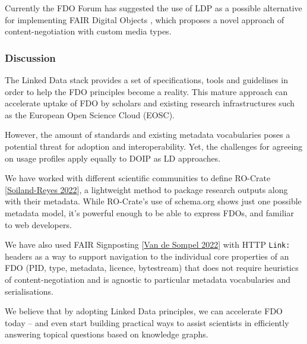 Currently the FDO Forum has suggested the use of LDP as a possible
alternative for implementing FAIR Digital Objects \cite{bonino2021}, which
proposes a novel approach of content-negotiation with custom media
types.

\subsubsection{Discussion}\label{ch2:discussion}

The Linked Data stack provides a set of specifications, tools and
guidelines in order to help the FDO principles become a reality. This
mature approach can accelerate uptake of FDO by scholars and existing
research infrastructures such as the European Open Science Cloud (EOSC).

However, the amount of standards and existing metadata vocabularies
poses a potential threat for adoption and interoperability. Yet, the
challenges for agreeing on usage profiles apply equally to DOIP as LD
approaches.

We have worked with different scientific communities to define RO-Crate
{[}\href{https://doi.org/10.3233/DS-210053}{Soiland-Reyes 2022}{]}, a
lightweight method to package research outputs along with their
metadata. While RO-Crate's use of schema.org shows just one possible
metadata model, it's powerful enough to be able to express FDOs, and
familiar to web developers.

We have also used FAIR Signposting
{[}\href{https://signposting.org/FAIR/}{Van de Sompel 2022}{]} with HTTP
\texttt{Link:} headers as a way to support navigation to the individual
core properties of an FDO (PID, type, metadata, licence, bytestream)
that does not require heuristics of content-negotiation and is agnostic
to particular metadata vocabularies and serialisations.

We believe that by adopting Linked Data principles, we can accelerate
FDO today -- and even start building practical ways to assist scientists
in efficiently answering topical questions based on knowledge graphs.

